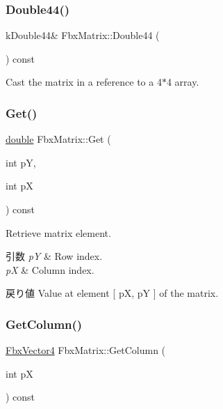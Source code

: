\mbox{\label{class_fbx_matrix_a0bb3a6188a337f2ae4e92bef4d2a0a3a}} 
\subsubsection{\texorpdfstring{Double44()}{Double44()}}
{\footnotesize\ttfamily k\+Double44\& Fbx\+Matrix\+::\+Double44 (\begin{DoxyParamCaption}{ }\end{DoxyParamCaption}) const}



Cast the matrix in a reference to a 4$\ast$4 array. 

\mbox{\label{class_fbx_matrix_a4efcbbd102b39375a1415b496c302ada}} 
\subsubsection{\texorpdfstring{Get()}{Get()}}
{\footnotesize\ttfamily \hyperlink{class_fbx_matrix_a01f8be57393e5d9973b23897c29d5520}{double} Fbx\+Matrix\+::\+Get (\begin{DoxyParamCaption}\item[{int}]{pY,  }\item[{int}]{pX }\end{DoxyParamCaption}) const}

Retrieve matrix element. 
\begin{DoxyParams}{引数}
{\em pY} & Row index. \\
\hline
{\em pX} & Column index. \\
\hline
\end{DoxyParams}
\begin{DoxyReturn}{戻り値}
Value at element \mbox{[} pX, pY \mbox{]} of the matrix. 
\end{DoxyReturn}
\mbox{\label{class_fbx_matrix_a1954028d6d499f4e5abb3395dd44b973}} 
\subsubsection{\texorpdfstring{Get\+Column()}{GetColumn()}}
{\footnotesize\ttfamily \hyperlink{class_fbx_vector4}{Fbx\+Vector4} Fbx\+Matrix\+::\+Get\+Column (\begin{DoxyParamCaption}\item[{int}]{pX }\end{DoxyParamCaption}) const}

